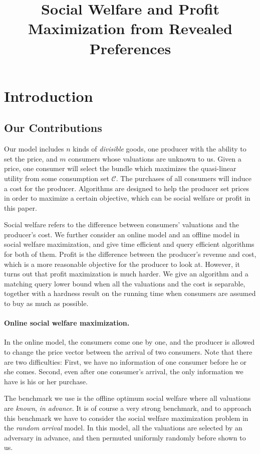 \documentclass{article}
\author{}
\title{Social Welfare and Profit Maximization from Revealed Preferences}
\begin{document}
\maketitle

\section{Introduction}
\subsection{Our Contributions}
Our model includes $n$ kinds of \emph{divisible} goods, one producer with the ability to set the price, and $m$ consumers whose valuations are unknown to us. Given a price, one consumer will select the bundle which maximizes the quasi-linear utility from some consumption set $\mathcal{C}$. The purchases of all consumers will induce a cost for the producer. Algorithms are designed to help the producer set prices in order to maximize a certain objective, which can be social welfare or profit in this paper.

Social welfare refers to the difference between consumers' valuations and the producer's cost. We further consider an online model and an offline model in social welfare maximization, and give time efficient and query efficient algorithms for both of them. Profit is the difference between the producer's revenue and cost, which is a more reasonable objective for the producer to look at. However, it turns out that profit maximization is much harder. We give an algorithm and a matching query lower bound when all the valuations and the cost is separable, together with a hardness result on the running time when consumers are assumed to buy as much as possible.

\paragraph{Online social welfare maximization.}
In the online model, the consumers come one by one, and the producer is allowed to change the price vector between the arrival of two consumers. Note that there are two difficulties: First, we have no information of one consumer before he or she comes. Second, even after one consumer's arrival, the only information we have is his or her purchase.

The benchmark we use is the offline optimum social welfare where all valuations are \emph{known}, \emph{in advance}. It is of course a very strong benchmark, and to approach this benchmark we have to consider the social welfare maximization problem in the \emph{random arrival} model. In this model, all the valuations are selected by an adversary in advance, and then permuted uniformly randomly before shown to us.
\end{document}
